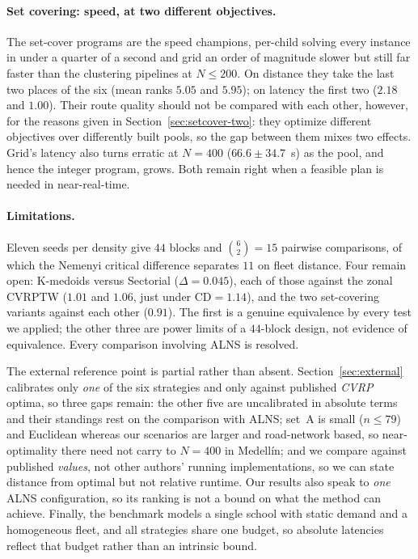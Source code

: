 \documentclass[graybox]{SNmult}
\begin{document}
\paragraph{Set covering: speed, at two different objectives.}
The set-cover programs are the speed champions, per-child solving every
instance in under a quarter of a second and grid an order of magnitude
slower but still far faster than the clustering pipelines at $N\le200$. On
distance they take the last two places of the six (mean ranks $5.05$ and
$5.95$); on latency the first two ($2.18$ and $1.00$). Their route quality
should not be compared with each other, however, for the reasons given in
Section~\ref{sec:setcover-two}: they optimize different objectives over
differently built pools, so the gap between them mixes two effects. Grid's
latency also turns erratic at $N=400$ ($66.6\pm34.7$~s) as the pool, and
hence the integer program, grows. Both remain right when a feasible plan
is needed in near-real-time.

\paragraph{Limitations.}
Eleven seeds per density give $44$ blocks and $\binom{6}{2}=15$ pairwise
comparisons, of which the Nemenyi critical difference separates $11$ on
fleet distance. Four remain open: K-medoids versus Sectorial
($\Delta=0.045$), each of those against the zonal CVRPTW ($1.01$ and
$1.06$, just under $\mathrm{CD}=1.14$), and the two set-covering variants
against each other ($0.91$). The first is a genuine equivalence by every
test we applied; the other three are power limits of a $44$-block design,
not evidence of equivalence. Every comparison involving ALNS is resolved.

The external reference point is partial rather than absent.
Section~\ref{sec:external} calibrates only \emph{one} of the six
strategies and only against published \emph{CVRP} optima, so three gaps
remain: the other five are uncalibrated in absolute terms and their
standings rest on the comparison with ALNS; set~A is small ($n\le79$) and
Euclidean whereas our scenarios are larger and road-network based, so
near-optimality there need not carry to $N=400$ in Medell\'in; and we
compare against published \emph{values}, not other authors' running
implementations, so we can state distance from optimal but not relative
runtime. Our results also speak to \emph{one} ALNS configuration, so its ranking is
not a bound on what the method can achieve. Finally, the benchmark models
a single school with static demand and a homogeneous fleet, and all
strategies share one budget, so absolute latencies reflect that budget
rather than an intrinsic bound.
\end{document}
